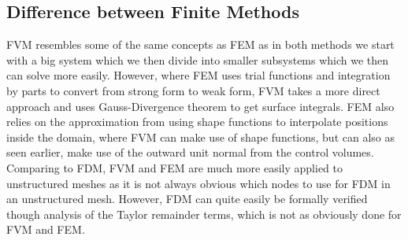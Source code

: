\subsection{Difference between Finite Methods}
FVM resembles some of the same concepts as FEM as in both methods we start with a big system which we then divide into smaller subsystems which we then can solve more easily. However, where FEM uses trial functions and integration by parts to convert from strong form to weak form, FVM takes a more direct approach and uses Gauss-Divergence theorem to get surface integrals. FEM also relies on the approximation from using shape functions to interpolate positions inside the domain, where FVM can make use of shape functions, but can also as seen earlier, make use of the outward unit normal from the control volumes. Comparing to FDM, FVM and FEM are much more easily applied to unstructured meshes as it is not always obvious which nodes to use for FDM in an unstructured mesh. However, FDM can quite easily be formally verified though analysis of the Taylor remainder terms, which is not as obviously done for FVM and FEM.